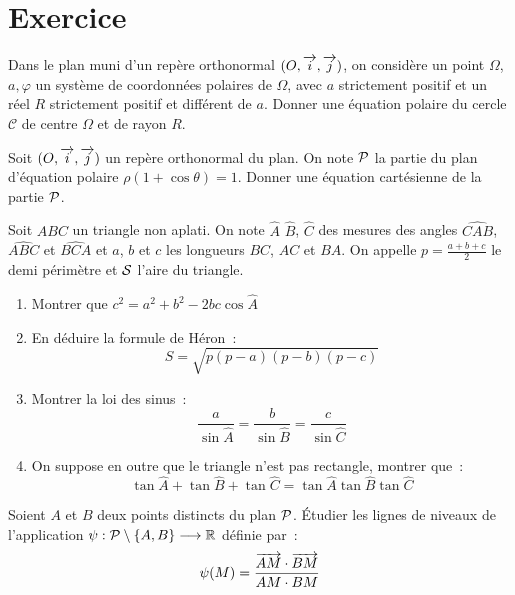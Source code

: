 \section{Exercice}
\begin{exercice}
    Dans le plan muni d'un repère orthonormal \((O, \vi, \vj)\), on considère un point \(\Omega\), \(a, \varphi\) un système de coordonnées polaires de \(\Omega\), avec \(a\) strictement positif et un réel \(R\)  strictement positif et différent de \(a\). Donner une équation polaire du cercle \(\mathcal{C}\) de centre \(\Omega\) et de rayon \(R\).
\end{exercice}
\begin{exercice}
    Soit \((O, \vi, \vj)\) un repère orthonormal du plan. On note \(\P\) la partie du plan d'équation polaire \(\rho(1+\cos\theta)=1\). Donner une équation cartésienne de la partie \(\P\).
\end{exercice}
\begin{exercice}
    Soit \(ABC\) un triangle non aplati. On note \(\hat{A}\) \(\hat{B}\), \(\hat{C}\) des mesures des angles \(\widehat{CAB}\), \(\widehat{ABC}\) et \(\widehat{BCA}\) et \(a\), \(b\) et \(c\) les longueurs \(BC\), \(AC\) et \(BA\). On appelle \(p = \frac{a+b+c}{2} \) le demi périmètre et \(\S\) l'aire du triangle.
    \begin{enumerate}
        \item Montrer que \(c^2=a^2+b^2-2bc\cos \hat{A}\)
        \item En déduire la formule de Héron~:
            \begin{equation}
                S = \sqrt{p(p-a)(p-b)(p-c)}
            \end{equation}
        \item Montrer la loi des sinus~:
            \begin{equation}
                \frac{a}{\sin \hat{A}} = \frac{b}{\sin \hat{B}} = \frac{c}{\sin \hat{C}}
            \end{equation}
        \item On suppose en outre que le triangle n'est pas rectangle, montrer que~:
            \begin{equation}
                \tan \hat{A} + \tan \hat{B} + \tan \hat{C} = \tan \hat{A} \tan \hat{B} \tan\hat{C}
            \end{equation}
    \end{enumerate}
\end{exercice}
\begin{exercice}
    Soient \(A\) et \(B\) deux points distincts du plan \(\P\). Étudier les lignes de niveaux de l'application \(\fonctionR{\psi}{\P\setminus\{A, B\}}{\R}\) définie par~:
    \begin{equation}
        \psi(M) = \frac{\vect{AM}\cdot\vect{BM}}{AM \cdot BM}
    \end{equation}
\end{exercice}
